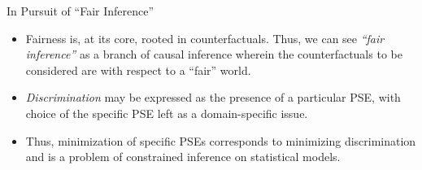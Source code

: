 \documentclass[12pt,t]{beamer}
\begin{document}
\begin{frame}[c]{In Pursuit of ``Fair Inference''}

\begin{center}
\begin{itemize}
  \itemsep10pt
  \item Fairness is, at its core, rooted in counterfactuals. Thus, we can see
    \textit{``fair inference''} as a branch of causal inference wherein the
    counterfactuals to be considered are with respect to a ``fair'' world.
  \item \textit{Discrimination} may be expressed as the presence of a particular
    PSE, with choice of the specific PSE left as a domain-specific issue.
  \item Thus, minimization of specific PSEs corresponds to minimizing
    discrimination and is a problem of constrained inference on statistical
    models.
\end{itemize}
\end{center}


\end{frame}

\end{document}
